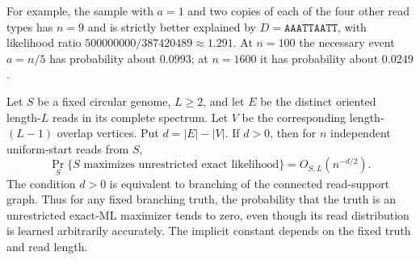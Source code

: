 For example, the sample with $a=1$ and two copies of each of
the four other read types has $n=9$ and is strictly better
explained by $D=\texttt{AAATTAATT}$, with likelihood ratio
$500000000/387420489\approx1.291$. At $n=100$ the necessary
event $a=n/5$ has probability about $0.0993$; at $n=1600$
it has probability about $0.0249$.

\begin{theorem}
\label{thm:unrestricted-branching-rate}
Let $S$ be a fixed circular genome, $L\ge2$, and let $E$ be the
distinct oriented length-$L$ reads in its complete spectrum.
Let $V$ be the corresponding length-$(L-1)$ overlap vertices.
Put $d=|E|-|V|$. If $d>0$, then for $n$ independent
uniform-start reads from $S$,
\[
  \Pr_S\{S\text{ maximizes unrestricted exact likelihood}\}
      = O_{S,L}(n^{-d/2}).
\]
The condition $d>0$ is equivalent to branching of the connected
read-support graph. Thus for any fixed branching truth, the
probability that the truth is an unrestricted exact-ML maximizer
tends to zero, even though its read distribution is learned
arbitrarily accurately. The implicit constant depends on the
fixed truth and read length.
\end{theorem}
